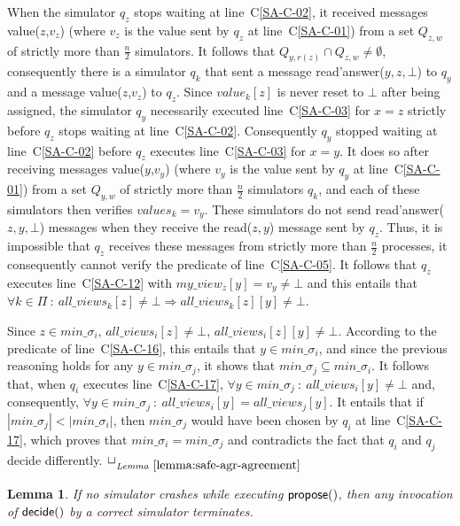 \documentclass[11pt,letterpaper]{article}
\newtheorem{lemma}{Lemma}
\newlength {\afterproof}
\newcommand{\toto}{xxx}
\newenvironment{proofL}{\noindent{\bf Proof }}
{\hspace*{\fill}$\Box_{\mathit{Lemma}~\ref{\toto}}$\par\vspace{\afterproof}}
\begin{document}
\begin{proofL}
When the simulator $q_z$ stops waiting at line~C\ref{SA-C-02}, it received
messages {\sc value}($z$,$v_z$)
(where $v_z$ is the value sent by $q_z$ at line~C\ref{SA-C-01})
from a set $Q_{z,w}$ of strictly more than $\frac{n}{2}$ simulators.
It follows that $Q_{y,r(z)}\cap Q_{z,w}\neq\emptyset$, consequently
there is a  simulator $q_k$ that sent
a message {\sc read'answer}($y,z,\bot$) to $q_y$ and a message
{\sc value}($z$,$v_z$) to $q_z$.
Since $value_k[z]$ is never reset to $\bot$ after being assigned,
the simulator $q_y$ necessarily executed line~C\ref{SA-C-03} for $x=z$
strictly before $q_z$ stops waiting at line~C\ref{SA-C-02}. Consequently
$q_y$ stopped waiting at line~C\ref{SA-C-02} before $q_z$
executes line~C\ref{SA-C-03} for $x=y$. It does so after receiving
messages {\sc value}($y$,$v_y$)
(where $v_y$ is the value sent by $q_y$ at line~C\ref{SA-C-01})
from a set $Q_{y,w}$ of strictly more than $\frac{n}{2}$ simulators
$q_k$, and each of these simulators then verifies $values_k=v_y$.
These simulators do not send {\sc read'answer}($z,y,\bot$) messages when
they receive the {\sc read}($z,y$) message sent by $q_z$.
Thus, it is impossible that $q_z$ receives these messages from strictly
more than $\frac{n}{2}$ processes,
it consequently cannot verify the predicate of line~C\ref{SA-C-05}. It
follows that $q_z$ executes line~C\ref{SA-C-12} with
$my\_view_z[y]=v_y\neq\bot$ and this entails that
$\forall k\in\Pi~:~all\_views_k[z]\neq\bot \Rightarrow
all\_views_k[z][y]\neq\bot$.

Since $z\in min\_\sigma_i$, $all\_views_i[z]\neq\bot$,
$all\_views_i[z][y]\neq\bot$.
According to the predicate of line~C\ref{SA-C-16}, this entails that
$y\in min\_\sigma_i$, and since the previous reasoning holds for any
$y\in min\_\sigma_j$, it shows that $min\_\sigma_j\subseteq min\_\sigma_i$.
It follows that, when $q_i$ executes line~C\ref{SA-C-17}, $\forall y\in
min\_\sigma_j~:~all\_views_i[y]\neq\bot$ and,
consequently, $\forall y\in
min\_\sigma_j~:~all\_views_i[y]=all\_views_j[y]$. It entails that if
$|min\_\sigma_j|<|min\_\sigma_i|$,
then $min\_\sigma_j$ would have been chosen by $q_i$ at
line~C\ref{SA-C-17}, which proves that $min\_\sigma_i=min\_\sigma_j$
and contradicts the fact that $q_i$ and $q_j$ decide differently.
\renewcommand{\toto}{lemma:safe-agr-agreement}
\end{proofL}

\begin{lemma}
\label{lemma:safe-agr-term-decide}
If no simulator crashes while executing  ${\sf propose}()$, then any
invocation of ${\sf decide}()$ by a correct simulator terminates.
\end{lemma}
\end{document}
